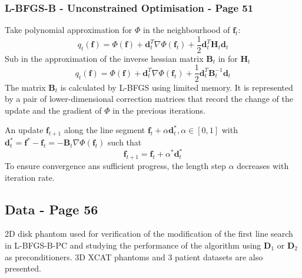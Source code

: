 \documentclass{article}
\begin{document}
\subsubsection{L-BFGS-B - Unconstrained Optimisation - Page 51}
Take polynomial approximation for $\Phi$ in the neighbourhood of $\textbf{f}_t$:
\[q_t(\textbf{f}) = \Phi(\textbf{f}) + \textbf{d}_t^T \nabla \Phi (\textbf{f}_t) +\frac{1}{2} \textbf{d}_t^T \textbf{H}_t \textbf{d}_t\]
Sub in the approximation of the inverse hessian matrix $\textbf{B}_t$ in for $\textbf{H}_t$
\[q_t(\textbf{f}) = \Phi(\textbf{f}) + \textbf{d}_t^T \nabla \Phi (\textbf{f}_t) +\frac{1}{2} \textbf{d}_t^T \textbf{B}_t^{-1} \textbf{d}_t\]
The matrix $\textbf{B}_t$ is calculated by L-BFGS using limited memory. It is represented by a pair of lower-dimensional correction matrices that record the change of the update and the gradient of $\Phi$ in the previous iterations.

An update $\textbf{f}_{t+1}$ along the line segment $\textbf{f}_t + \alpha \textbf{d}_t^* , \alpha \in [0,1]$ with $\textbf{d}_t^* = \textbf{f}^* - \textbf{f}_t = - \textbf{B}_t \nabla \Phi (\textbf{f}_t)$ such that
\[\textbf{f}_{t+1} = \textbf{f}_t + \alpha^* \textbf{d}_t^*\]
To ensure convergence ans sufficient progress, the length step $\alpha$ decreases with iteration rate. 


\subsection{Data - Page 56}
2D disk phantom used for verification of the modification of the first line search in L-BFGS-B-PC and studying the performance of the algorithm using $\textbf{D}_1$ or $\textbf{D}_2$ as preconditioners. 3D XCAT phantoms and 3 patient datasets are also presented.




\subsection{}





\newpage

 

\end{document}
